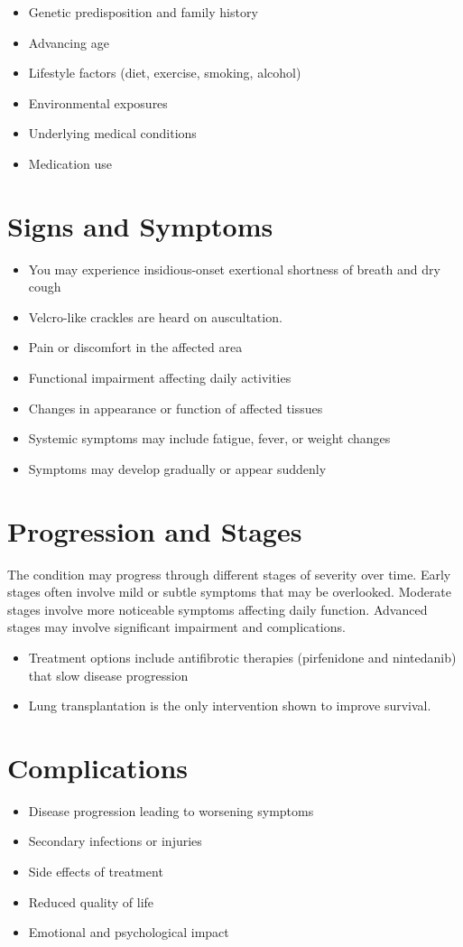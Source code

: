 \begin{itemize}[noitemsep]
  \item Genetic predisposition and family history
  \item Advancing age
  \item Lifestyle factors (diet, exercise, smoking, alcohol)
  \item Environmental exposures
  \item Underlying medical conditions
  \item Medication use
\end{itemize}
\section{Signs and Symptoms}
\begin{itemize}[noitemsep]
  \item You may experience insidious-onset exertional shortness of breath and dry cough
  \item Velcro-like crackles are heard on auscultation.
  \item Pain or discomfort in the affected area
  \item Functional impairment affecting daily activities
  \item Changes in appearance or function of affected tissues
  \item Systemic symptoms may include fatigue, fever, or weight changes
  \item Symptoms may develop gradually or appear suddenly
\end{itemize}
\section{Progression and Stages}
The condition may progress through different stages of severity over time. Early stages often involve mild or subtle symptoms that may be overlooked. Moderate stages involve more noticeable symptoms affecting daily function. Advanced stages may involve significant impairment and complications.

\begin{itemize}[noitemsep]
  \item Treatment options include antifibrotic therapies (pirfenidone and nintedanib) that slow disease progression
  \item Lung transplantation is the only intervention shown to improve survival.
\end{itemize}
\section{Complications}
\begin{itemize}[noitemsep]
  \item Disease progression leading to worsening symptoms
  \item Secondary infections or injuries
  \item Side effects of treatment
  \item Reduced quality of life
  \item Emotional and psychological impact
\end{itemize}

